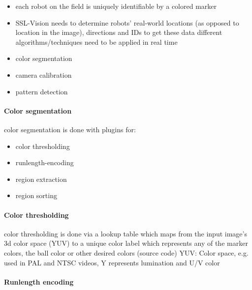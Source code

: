 \begin{itemize}
  \item each robot on the field is uniquely identifiable by a colored marker
  \item SSL-Vision needs to determine robots’ real-world locations (as opposed
        to location in the image), directions and IDs to get these data
        different algorithms/techniques need to be applied in real time
  \item color segmentation
  \item camera calibration
  \item pattern detection
\end{itemize}

\paragraph{Color segmentation}
color segmentation is done with plugins for:
\begin{itemize}
  \item color thresholding
  \item runlength-encoding 
  \item region extraction
  \item region sorting
\end{itemize}

\paragraph{Color thresholding}
color thresholding is done via a lookup table which maps from the input image’s
3d color space (YUV) to a unique color label which represents any of the marker
colors, the ball color or other desired colors (source code) YUV: Color space,
e.g. used in PAL and NTSC videos, Y represents lumination and U/V color

\paragraph{Runlength encoding}

